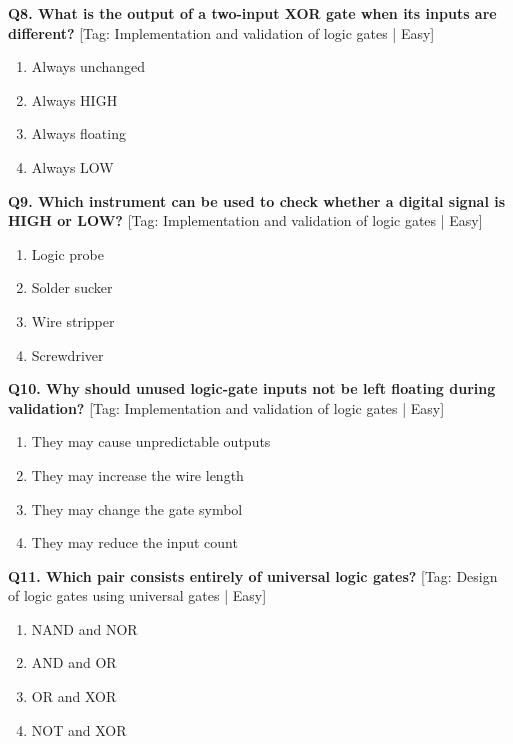 \noindent\textbf{Q8. What is the output of a two-input XOR gate when its inputs are different?} \hfill [Tag: Implementation and validation of logic gates | Easy]
\begin{enumerate}[label=(\alph*),topsep=2pt,itemsep=1pt,partopsep=0pt,parsep=0pt]
    \item {Always unchanged}
    \item {Always HIGH}
    \item {Always floating}
    \item {Always LOW}
\end{enumerate}
\vspace{2mm}

\noindent\textbf{Q9. Which instrument can be used to check whether a digital signal is HIGH or LOW?} \hfill [Tag: Implementation and validation of logic gates | Easy]
\begin{enumerate}[label=(\alph*),topsep=2pt,itemsep=1pt,partopsep=0pt,parsep=0pt]
    \item {Logic probe}
    \item {Solder sucker}
    \item {Wire stripper}
    \item {Screwdriver}
\end{enumerate}
\vspace{2mm}

\noindent\textbf{Q10. Why should unused logic-gate inputs not be left floating during validation?} \hfill [Tag: Implementation and validation of logic gates | Easy]
\begin{enumerate}[label=(\alph*),topsep=2pt,itemsep=1pt,partopsep=0pt,parsep=0pt]
    \item {They may cause unpredictable outputs}
    \item {They may increase the wire length}
    \item {They may change the gate symbol}
    \item {They may reduce the input count}
\end{enumerate}
\vspace{2mm}

\noindent\textbf{Q11. Which pair consists entirely of universal logic gates?} \hfill [Tag: Design of logic gates using universal gates | Easy]
\begin{enumerate}[label=(\alph*),topsep=2pt,itemsep=1pt,partopsep=0pt,parsep=0pt]
    \item {NAND and NOR}
    \item {AND and OR}
    \item {OR and XOR}
    \item {NOT and XOR}
\end{enumerate}
\vspace{2mm}

